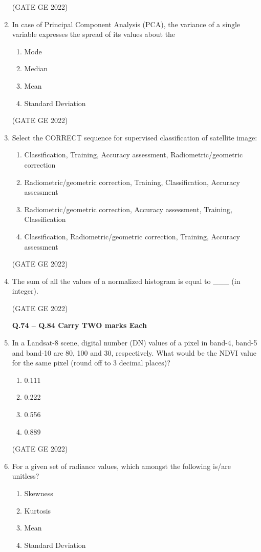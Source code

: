 \documentclass[a4paper, 11pt]{article}
\begin{document}
\begin{enumerate}
\hfill (GATE GE 2022)

\item In case of Principal Component Analysis (PCA), the variance of a single variable expresses the spread of its values about the
\begin{enumerate}
    \item Mode
    \item Median
    \item Mean
    \item Standard Deviation
\end{enumerate}

\hfill (GATE GE 2022)

\item Select the CORRECT sequence for supervised classification of satellite image:
\begin{enumerate}
    \item Classification, Training, Accuracy assessment, Radiometric/geometric correction
    \item Radiometric/geometric correction, Training, Classification, Accuracy assessment
    \item Radiometric/geometric correction, Accuracy assessment, Training, Classification
    \item Classification, Radiometric/geometric correction, Training, Accuracy assessment
\end{enumerate}

\hfill (GATE GE 2022)

\item The sum of all the values of a normalized histogram is equal to \_\_\_ (in integer).

\hfill (GATE GE 2022)

\textbf{Q.74 – Q.84 Carry TWO marks Each}

\item In a Landsat-8 scene, digital number (DN) values of a pixel in band-4, band-5 and band-10 are 80, 100 and 30, respectively. What would be the NDVI value for the same pixel (round off to 3 decimal places)?
\begin{enumerate}
    \item 0.111
    \item 0.222
    \item 0.556
    \item 0.889
\end{enumerate}

\hfill (GATE GE 2022)

\item For a given set of radiance values, which amongst the following is/are unitless?
\begin{enumerate}
    \item Skewness
    \item Kurtosis
    \item Mean
    \item Standard Deviation
\end{enumerate}


\end{enumerate}
\end{document}
